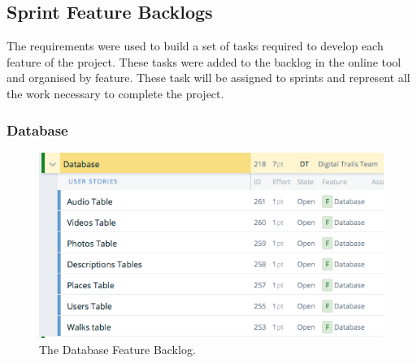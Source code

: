 \documentclass[11pt,a4paper]{article}
\begin{document}
\subsection{Sprint Feature Backlogs}
\label{sec:sprint-backlogs}

The requirements were used to build a set of tasks required to develop each feature of the project. These tasks were added to the backlog in the online tool and organised by feature. These task will be assigned to sprints and represent all the work necessary to complete the project. 

\subsubsection{Database}
\label{sec:database-plan}

\begin{figure}[H]
\centering
\includegraphics[width = 140mm]{backlog/Database.png}
\caption{The Database Feature Backlog.}
\label{fig:backlogDatab}
\end{figure}
\end{document}
